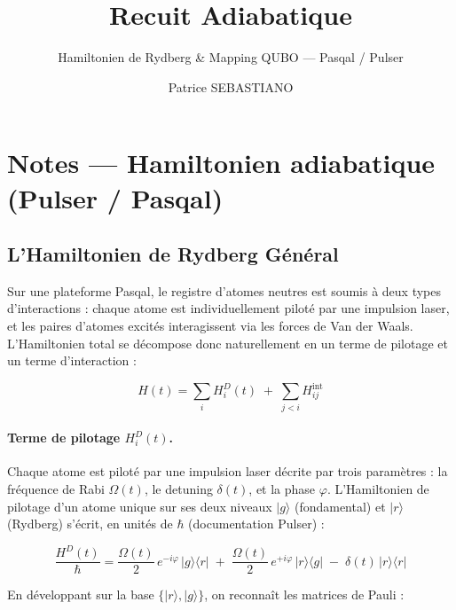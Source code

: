\documentclass{ceri/sty/rapport}
\title{Recuit Adiabatique}
\subtitle{Hamiltonien de Rydberg \& Mapping QUBO --- Pasqal / Pulser}
\author{
	Patrice SEBASTIANO
}
\begin{document}
\maketitle
\chead{\textcolor{black}{Recuit Adiabatique -- Hamiltonien de Rydberg \& Mapping QUBO -- Pasqal}}
\sloppy

\section{Notes --- Hamiltonien adiabatique (Pulser / Pasqal)}
\label{sec:hamiltonien}

\subsection{L'Hamiltonien de Rydberg Général}

Sur une plateforme Pasqal, le registre d'atomes neutres est soumis à deux types d'interactions :
chaque atome est individuellement piloté par une impulsion laser, et les paires d'atomes excités
interagissent via les forces de Van der Waals. L'Hamiltonien total se décompose donc naturellement
en un terme de pilotage et un terme d'interaction :

\begin{equation}
H(t) = \sum_i H_i^D(t) \;+\; \sum_{j<i} H_{ij}^{\mathrm{int}}
\end{equation}

\paragraph{Terme de pilotage $H_i^D(t)$.}
Chaque atome est piloté par une impulsion laser décrite par trois paramètres : la fréquence de
Rabi $\Omega(t)$, le detuning $\delta(t)$, et la phase $\varphi$. L'Hamiltonien de pilotage
d'un atome unique sur ses deux niveaux $|g\rangle$ (fondamental) et $|r\rangle$ (Rydberg)
s'écrit, en unités de $\hbar$ (documentation Pulser) :

\begin{equation}
\frac{H^D(t)}{\hbar} = \frac{\Omega(t)}{2}\,e^{-i\varphi}\,|g\rangle\langle r|
\;+\; \frac{\Omega(t)}{2}\,e^{+i\varphi}\,|r\rangle\langle g|
\;-\; \delta(t)\,|r\rangle\langle r|
\end{equation}

En développant sur la base $\{|r\rangle, |g\rangle\}$, on reconnaît les matrices de Pauli :
\end{document}
